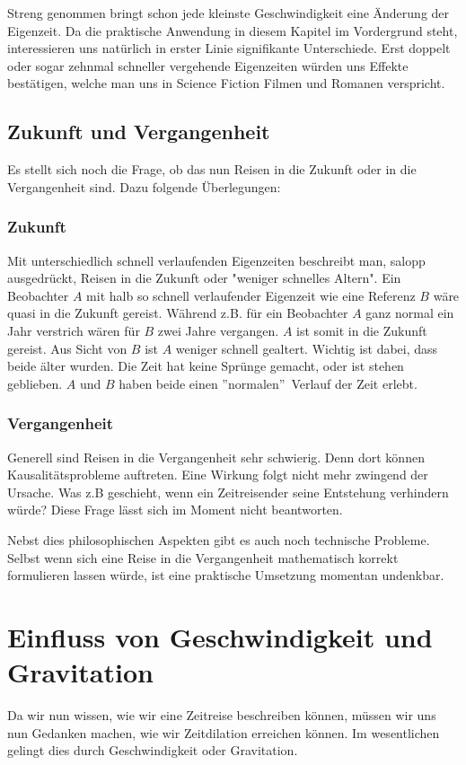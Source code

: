 \begin{refsection}
Streng genommen bringt schon jede kleinste Geschwindigkeit eine Änderung der Eigenzeit. Da die praktische Anwendung in diesem Kapitel im Vordergrund steht, interessieren uns natürlich in erster Linie signifikante Unterschiede. Erst doppelt oder sogar zehnmal schneller vergehende Eigenzeiten w\"urden uns Effekte best\"atigen, welche man uns in Science Fiction Filmen und Romanen verspricht.

\subsection{Zukunft und Vergangenheit}
Es stellt sich noch die Frage, ob das nun Reisen in die Zukunft oder in die Vergangenheit sind. Dazu folgende Überlegungen:

\subsubsection{Zukunft}
Mit unterschiedlich schnell verlaufenden Eigenzeiten beschreibt man, salopp ausgedrückt, Reisen in die Zukunft oder "weniger schnelles Altern". Ein Beobachter $A$ mit halb so schnell verlaufender Eigenzeit wie eine Referenz $B$ wäre quasi in die Zukunft gereist.
Während z.B. für ein Beobachter $A$ ganz normal ein Jahr verstrich wären für $B$ zwei Jahre vergangen. $A$ ist somit in die Zukunft gereist. Aus Sicht von $B$ ist $A$ weniger schnell gealtert. Wichtig ist dabei, dass beide älter wurden. Die Zeit hat keine Sprünge gemacht, oder ist stehen geblieben. $A$ und $B$ haben beide einen ''normalen''~Verlauf der Zeit erlebt.

\subsubsection{Vergangenheit}
Generell sind Reisen in die Vergangenheit sehr schwierig. Denn dort können Kausalitätsprobleme auftreten. Eine Wirkung folgt nicht mehr zwingend der Ursache. Was z.B geschieht, wenn ein Zeitreisender seine Entstehung verhindern würde? Diese Frage lässt sich im Moment nicht beantworten. 

Nebst dies philosophischen Aspekten gibt es auch noch technische Probleme. Selbst wenn sich eine Reise in die Vergangenheit mathematisch korrekt formulieren lassen würde, ist eine praktische Umsetzung momentan undenkbar.

\section{Einfluss von Geschwindigkeit und Gravitation}
Da wir nun wissen, wie wir eine Zeitreise beschreiben können, müssen wir uns nun Gedanken machen, wie wir Zeitdilation erreichen können. Im wesentlichen gelingt dies durch Geschwindigkeit oder Gravitation. 

\end{refsection}
